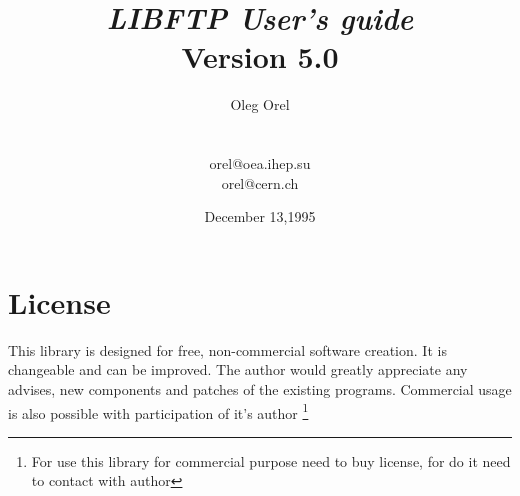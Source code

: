 \pagestyle{empty}
\pagestyle{fancyplain}
\newcommand{\tit}[1]{#1}
\rhead[\fancyplain{}{\tit{\leftmark}}]{\fancyplain{}{\tit{\rightmark}}}
\lhead[\fancyplain{}{\tit{\rightmark}}]{\fancyplain{}{\tit{\leftmark}}}
\chead{\hfill}
\lfoot[\fancyplain{}{\tit{\thepage}}]{\fancyplain{}{\hfill}}
\rfoot[\fancyplain{}{\hfill}]{\fancyplain{}{\tit{\thepage}}}
\cfoot{\hfill}
\renewcommand{\sectionmark}[1]{\markboth{#1}{\ }}
\renewcommand{\subsectionmark}[1]{\markright{\ }}
\newcommand{\look}[1]{(Chapter~\ref{#1}, page~\pageref{#1})}
\newcommand{\toindex}[1]{\underline{\bf#1}\index{#1}}
\newcommand{\add}[1]{\symbol{64}}
\newcommand{\ps}[1]{\symbol{37}s}
\newcommand{\twcol}[4]{
\noindent\parbox[t]{#1\textwidth}{#3} \hfill \parbox[t]{#2\textwidth}{#4\hfill}\\
}
\newcommand{\tc}[2]{\twcol{0.49}{0.49}{#1}{#2}}
\newcommand{\tcc}[2]{\twcol{0.49}{0.49}{\toindex{#1}}{#2}}
\newcommand{\ttt}[2]{\bigskip

{\bf#1}

#2}
\newcommand{\ts}[1]{{\underline{\bf#1}}}
\newcommand{\dl}[2]{\parbox[t]{0.4\textwidth}{#1\hfill}\hfill
                    \parbox[t]{0.4\textwidth}{#2\hfill}}
\makeindex
 
\title{{\bf\it{}LIBFTP User's guide}\\Version 5.0}
\author{Oleg Orel\\\\\\orel@oea.ihep.su\\orel@cern.ch}
\date{December 13,1995}
\newpage
\maketitle

\section*{License}

This library is designed for free, non-commercial software creation. 
It is changeable and can be improved. The author would greatly appreciate 
any advises, new components and patches of the existing programs.
Commercial usage is also possible with participation of it's author
\footnote{For use this library for commercial purpose need to buy license, for do it
need to contact with author}

